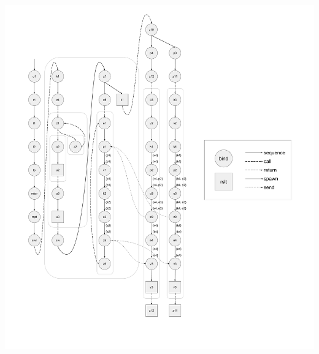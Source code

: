 \documentclass[10pt]{article}
\begin{document}
\includegraphics[width=1.3\textwidth, left]{cml-liveness-analysis-k4.pdf}
\end{document}
